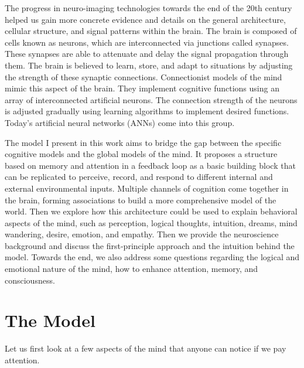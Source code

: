 \documentclass[reprint,amsmath,amssymb,apr,aip,onecolumn, 11pt]{revtex4-1}
\begin{document}
	The progress in neuro-imaging technologies towards the end of the 20th century helped us gain more concrete evidence and details on the general architecture, cellular structure, and signal patterns within the brain. The brain is composed of cells known as neurons, which are interconnected via junctions called synapses. These synapses are able to attenuate and delay the signal propagation through them. The brain is believed to learn, store, and adapt to situations by adjusting the strength of these synaptic connections. Connectionist models of the mind mimic this aspect of the brain. They implement cognitive functions using an array of interconnected artificial neurons. The connection strength of the neurons is adjusted gradually using learning algorithms to implement desired functions. Today's artificial neural networks (ANNs) come into this group. 
	
	The model I present in this work aims to bridge the gap between the specific cognitive models and the global models of the mind. It proposes a structure based on memory and attention in a feedback loop as a basic building block that can be replicated to perceive, record, and respond to different internal and external environmental inputs. Multiple channels of cognition come together in the brain, forming associations to build a more comprehensive model of the world. Then we explore how this architecture could be used to explain behavioral aspects of the mind, such as perception, logical thoughts, intuition, dreams, mind wandering, desire, emotion, and empathy.  Then we provide the neuroscience background and discuss the first-principle approach and the intuition behind the model. Towards the end, we also address some questions regarding the logical and emotional nature of the mind, how to enhance attention, memory, and consciousness. 
	
	

	
	
	
	\section{The Model }
	Let us first look at a few aspects of the mind that anyone can notice if we pay attention. 
	
\end{document}
